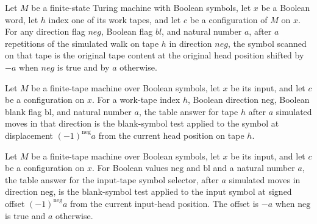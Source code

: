 \begin{theorem}
\label{Complexity.Meyer.walked_work}
\leanok
{}
Let $M$ be a finite-state Turing machine with Boolean symbols, let $x$ be a Boolean
word, let $h$ index one of its work tapes, and let $c$ be a configuration of $M$ on $x$.
For any direction flag $neg$, Boolean flag $bl$, and natural number $a$, after $a$
repetitions of the simulated walk on tape $h$ in direction $neg$, the symbol scanned on
that tape is the original tape content at the original head position shifted by $-a$
when $neg$ is true and by $a$ otherwise.
\end{theorem}

\begin{theorem}
\label{Complexity.Meyer.tabAns_sym_some}
\leanok
{}
Let $M$ be a finite-tape machine over Boolean symbols, let $x$ be its input, and let $c$
be a configuration on $x$. For a work-tape index $h$, Boolean direction $\mathrm{neg}$,
Boolean blank flag $\mathrm{bl}$, and natural number $a$, the table answer for tape $h$
after $a$ simulated moves in that direction is the blank-symbol test applied to the
symbol at displacement $(-1)^{\mathrm{neg}}a$ from the current head position on tape
$h$.
\end{theorem}

\begin{theorem}
\label{Complexity.Meyer.tabAns_sym_none}
\leanok
{}
Let $M$ be a finite-tape machine over Boolean symbols, let $x$ be its input, and let $c$
be a configuration on $x$. For Boolean values $\mathrm{neg}$ and $\mathrm{bl}$ and a
natural number $a$, the table answer for the input-tape symbol selector, after $a$
simulated moves in direction $\mathrm{neg}$, is the blank-symbol test applied to the
input symbol at signed offset $(-1)^{\mathrm{neg}}a$ from the current input-head
position. The offset is $-a$ when $\mathrm{neg}$ is true and $a$ otherwise.
\end{theorem}

